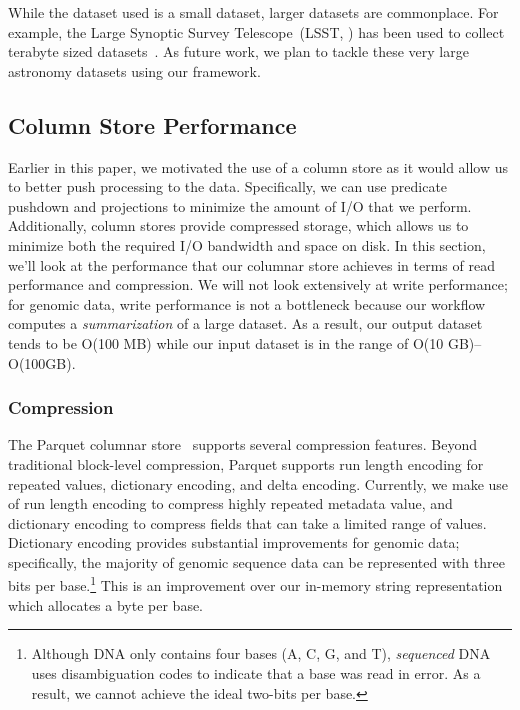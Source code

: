 \documentclass{acm_proc_article-sp}
\begin{document}
While the dataset used is a small dataset, larger datasets are commonplace. For example, the Large Synoptic
Survey Telescope~(LSST, \cite{lsst2008}) has been used to collect terabyte sized datasets~\cite{moyers13}. As
future work, we plan to tackle these very large astronomy datasets using our framework.

\subsection{Column Store Performance}
\label{sec:column-store-perf}

Earlier in this paper, we motivated the use of a column store as it would allow us to better push processing to
the data. Specifically, we can use predicate pushdown and projections to minimize the amount of I/O that we
perform. Additionally, column stores provide compressed storage, which allows us to minimize both the required
I/O bandwidth and space on disk. In this section, we'll look at the performance that our columnar store achieves
in terms of read performance and compression. We will not look extensively at write performance; for genomic
data, write performance is not a bottleneck because our workflow computes a \emph{summarization} of a large
dataset. As a result, our output dataset tends to be O(100 MB) while our input dataset is in the range of
O(10 GB)--O(100GB).

\pagebreak

\subsubsection{Compression}
\label{sec:compression}

The Parquet columnar store~\cite{parquet} supports several compression features. Beyond traditional block-level
compression, Parquet supports run length encoding for repeated values, dictionary encoding, and delta
encoding. Currently, we make use of run length encoding to compress highly repeated metadata value,
and dictionary encoding to compress fields that can take a limited range of values. Dictionary encoding provides
substantial improvements for genomic data; specifically, the majority of genomic sequence data can be
represented with three bits per base.\footnote{Although DNA only contains four bases (A, C, G, and T),
\emph{sequenced} DNA uses disambiguation codes to indicate that a base was read in error. As a result, we
cannot achieve the ideal two-bits per base.} This is an improvement over our in-memory string representation
which allocates a byte per base.
\end{document}
